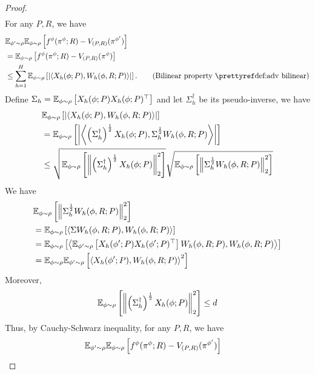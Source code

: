 \begin{proof}
\begin{align}
\label{eq:model-free full}
\end{align}
For any $P, R$, we have
\begin{align*}
&\E_{\phi' \sim \rho}\E_{\phi \sim \rho}\left[f^{\phi}(\pi^{\phi}; R) - V_{(P,R)}(\pi^{\phi'}) \right]
\\&= \E_{\phi \sim \rho}\left[f^{\phi}(\pi^{\phi}; R) - V_{(P,R)}(\pi^{\phi}) \right]
    \\&\leq \sum_{h=1}^H  \E_{\phi \sim \rho}\left[\left|\langle X_h(\phi; P), W_h(\phi, R; P)\rangle\right|\right]. \tag{Bilinear property \pref{def:adv bilinear}}
\end{align*}
Define $\Sigma_h = \mathbb{E}_{\phi \sim \rho}\left[X_h(\phi; P)X_h(\phi; P)^\top\right]$ and let $\Sigma_h^{\dagger}$ be its pseudo-inverse, we have
\begin{align*}
    &\mathbb{E}_{\phi \sim \rho} \left[
\left|\langle X_h(\phi; P), W_h(\phi, R; P)\rangle\right|
\right] 
\\&= \mathbb{E}_{\phi \sim \rho}\left[
\left|\left\langle \left(\Sigma_h^\dagger\right)^{\frac{1}{2}}X_h(\phi; P), \Sigma_h^{\frac{1}{2}}W_h(\phi, R; P)\right\rangle\right|
\right]
\\&\le \sqrt{\mathbb{E}_{\phi \sim \rho}\left[\left\|\left(\Sigma_h^\dagger\right)^{\frac{1}{2}}X_h(\phi; P)\right\|_2^2\right]} \sqrt{\mathbb{E}_{\phi \sim \rho}\left[\left\|\Sigma_h^{\frac{1}{2}}W_h(\phi, R; P)\right\|_2^2\right]}
\end{align*}
We have
\begin{align*}
&\mathbb{E}_{\phi \sim \rho} \left[\left\|\Sigma_h^{\frac{1}{2}}W_h(\phi, R; P)\right\|_2^2\right] 
\\&= \mathbb{E}_{\phi \sim \rho}\left[\left\langle \Sigma W_h(\phi, R; P), W_h(\phi, R; P) \right\rangle\right]
\\&= \mathbb{E}_{\phi \sim \rho} \left[\left\langle \mathbb{E}_{\phi' \sim \rho}\left[X_h(\phi'; P)X_h(\phi'; P)^\top\right] W_h(\phi, R; P), W_h(\phi, R; P) \right\rangle\right]
\\&= \mathbb{E}_{\phi \sim \rho}\mathbb{E}_{\phi' \sim \rho} \left[\left\langle X_h(\phi'; P) , W_h(\phi, R; P)\right\rangle^2\right]
\end{align*}
Moreover, 
\begin{align*}
    \mathbb{E}_{\phi \sim \rho}\left[\left\|\left(\Sigma_h^\dagger\right)^{\frac{1}{2}}X_h(\phi; P)\right\|_2^2\right] \le d
\end{align*}
Thus, by Cauchy-Schwarz inequality, for any $P, R$, we have
\begin{align}
    &\E_{\phi' \sim \rho}\E_{\phi \sim \rho}\left[f^{\phi}(\pi^{\phi}; R) - V_{(P,R)}(\pi^{\phi'}) \right] \nonumber

\end{align}
\end{proof}
